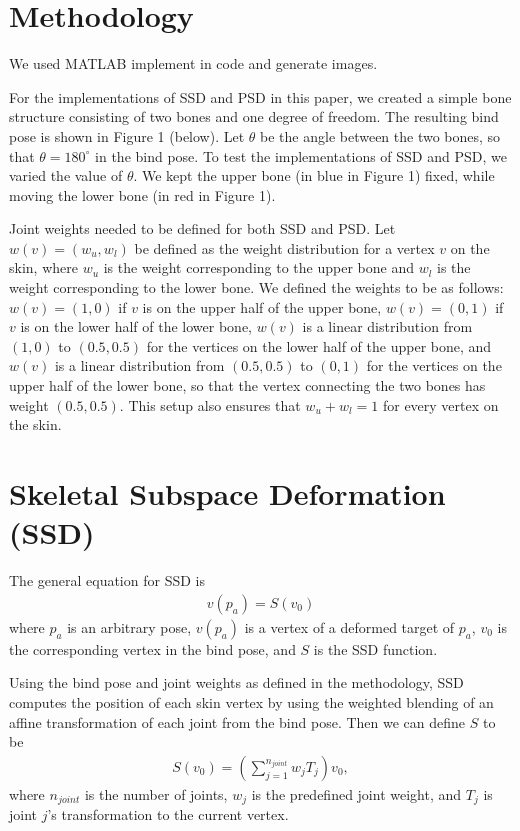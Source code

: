\documentclass[10pt,twocolumn,letterpaper]{article}
\begin{document}
\section{Methodology}

We used MATLAB implement in code and generate images.

For the implementations of SSD and PSD in this paper, we created a simple bone structure consisting of two bones and one degree of freedom. The resulting bind pose is shown in Figure 1 (below). Let $\theta$ be the angle between the two bones, so that $\theta = 180^{\circ}$ in the bind pose. To test the implementations of SSD and PSD, we varied the value of $\theta$. We kept the upper bone (in blue in Figure 1) fixed, while moving the lower bone (in red in Figure 1).

Joint weights needed to be defined for both SSD and PSD. Let $w(v) = (w_u, w_l)$ be defined as the weight distribution for a vertex $v$ on the skin, where $w_u$ is the weight corresponding to the upper bone and $w_l$ is the weight corresponding to the lower bone. We defined the weights to be as follows: $w(v) = (1,0)$ if $v$ is on the upper half of the upper bone, $w(v) = (0,1)$ if $v$ is on the lower half of the lower bone, $w(v)$ is a linear distribution from $(1,0)$ to $(0.5,0.5)$ for the vertices on the lower half of the upper bone, and $w(v)$ is a linear distribution from $(0.5,0.5)$ to $(0,1)$ for the vertices on the upper half of the lower bone, so that the vertex connecting the two bones has weight $(0.5,0.5)$. This setup also ensures that $w_u + w_l = 1$ for every vertex on the skin.

\section{Skeletal Subspace Deformation (SSD)}

The general equation for SSD is
\begin{align} v(p_a) = S(v_0) \end{align}
where $p_a$ is an arbitrary pose, $v(p_a)$ is a vertex of a deformed target of $p_a$, $v_0$ is the corresponding vertex in the bind pose, and $S$ is the SSD function.

Using the bind pose and joint weights as defined in the methodology, SSD computes the position of each skin vertex by using the weighted blending of an affine transformation of each joint from the bind pose. Then we can define $S$ to be
\begin{align} S(v_0) = (\sum_{j=1}^{n_{joint}} w_j T_j) v_0, \end{align}
where $n_{joint}$ is the number of joints, $w_j$ is the predefined joint weight, and $T_j$ is joint $j$'s transformation to the current vertex.
\end{document}
